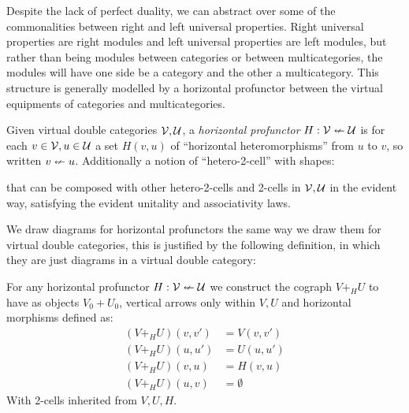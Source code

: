 \documentclass{article}
\begin{document}
Despite the lack of perfect duality, we can abstract over some of the
commonalities between right and left universal properties.
%
Right universal properties are right modules and left universal
properties are left modules, but rather than being modules between
categories or between multicategories, the modules will have one side
be a category and the other a multicategory.
%
This structure is generally modelled by a horizontal profunctor
between the virtual equipments of categories and multicategories.

\begin{definition}
  Given virtual double categories $\mathcal{V},\mathcal{U}$, a
  \emph{horizontal profunctor} $H : \mathcal V \nleftarrow \mathcal U$ is for
  each $v \in \mathcal V, u \in \mathcal U$ a set $H(v,u)$ of ``horizontal
  heteromorphisms'' from $u$ to $v$, so written $v \nleftarrow u$.
  Additionally a notion of ``hetero-2-cell'' with shapes:


  that can be composed with other hetero-2-cells and 2-cells in $\mathcal
  V, \mathcal U$ in the evident way, satisfying the evident unitality and
  associativity laws.
\end{definition}

We draw diagrams for horizontal profunctors the same way we draw them
for virtual double categories, this is justified by the following
definition, in which they are just diagrams in a virtual double category:

\begin{definition}
  For any horizontal profunctor $H : \mathcal V \nleftarrow \mathcal U$ we
  construct the cograph $V +_{H} U$ to have as objects $V_0 + U_0$,
  vertical arrows only within $V,U$ and horizontal morphisms defined
  as:
  \begin{align*}
    (V +_{H} U)(v,v') &= V(v,v')\\
    (V +_{H} U)(u,u') &= U(u,u')\\
    (V +_{H} U)(v,u) &= H(v,u)\\
    (V +_{H} U)(u,v) &= \emptyset
  \end{align*}
  With 2-cells inherited from $V,U,H$.
\end{definition}
\end{document}
